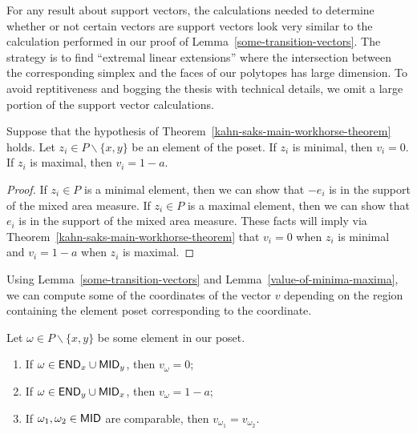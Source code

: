 \documentclass{puthesis-UG}
\begin{document}
For any result about support vectors, the calculations needed to determine whether or not certain vectors are support vectors look very similar to the calculation performed in our proof of Lemma~\ref{some-transition-vectors}. The strategy is to find ``extremal linear extensions'' where the intersection between the corresponding simplex and the faces of our polytopes has large dimension. To avoid reptitiveness and bogging the thesis with technical details, we omit a large portion of the support vector calculations. 

\begin{lem} \label{value-of-minima-maxima}
    Suppose that the hypothesis of Theorem~\ref{kahn-saks-main-workhorse-theorem} holds. Let $z_i \in P \backslash \{x, y\}$ be an element of the poset. If $z_i$ is minimal, then $v_i = 0$. If $z_i$ is maximal, then $v_i = 1-a$. 
\end{lem}

\begin{proof}
	If $z_i \in P$ is a minimal element, then we can show that $-e_i$ is in the support of the mixed area measure. If $z_i \in P$ is a maximal element, then we can show that $e_i$ is in the support of the mixed area measure. These facts will imply via Theorem~\ref{kahn-saks-main-workhorse-theorem} that $v_i = 0$ when $z_i$ is minimal and $v_i = 1-a$ when $z_i$ is maximal. 
\end{proof}

Using Lemma~\ref{some-transition-vectors} and Lemma~\ref{value-of-minima-maxima}, we can compute some of the coordinates of the vector $v$ depending on the region containing the element poset corresponding to the coordinate.  

\begin{cor} \label{cor-coordinates-in-the-regions}
    Let $\omega \in P \backslash \{x, y\}$ be some element in our poset. 
    \begin{enumerate}[label = (\alph*)]
        \item If $\omega \in \mathsf{END}_x \cup \mathsf{MID}_y$, then $v_\omega = 0$;
        \item If $\omega \in \mathsf{END}_y \cup \mathsf{MID}_x$, then $v_\omega = 1-a$;
        \item If $\omega_1, \omega_2 \in \mathsf{MID}$ are comparable, then $v_{\omega_1} = v_{\omega_2}$.
    \end{enumerate}
\end{cor}
\end{document}
